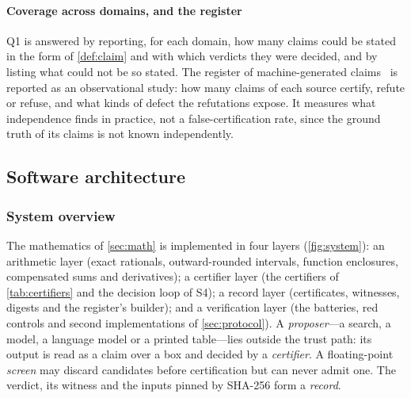 \documentclass[preprint,11pt,a4paper]{elsarticle}
\theoremstyle{definition}
\newcommand{\supp}[1]{S#1}
\begin{document}
\paragraph{Coverage across domains, and the register}
Q1 is answered by reporting, for each domain, how many claims could be stated in the form of \cref{def:claim} and with which verdicts they were decided, and by listing what could not be so stated. The register of machine-generated claims~\citep{Register} is reported as an observational study: how many claims of each source certify, refute or refuse, and what kinds of defect the refutations expose. It measures what independence finds in practice, not a false-certification rate, since the ground truth of its claims is not known independently.

\subsection{Software architecture}\label{sec:architecture}

\subsubsection{System overview}\label{sec:overview}

The mathematics of \cref{sec:math} is implemented in four layers (\cref{fig:system}): an arithmetic layer (exact rationals, outward-rounded intervals, function enclosures, compensated sums and derivatives); a certifier layer (the certifiers of \cref{tab:certifiers} and the decision loop of \supp{4}); a record layer (certificates, witnesses, digests and the register's builder); and a verification layer (the batteries, red controls and second implementations of \cref{sec:protocol}). A \emph{proposer}---a search, a model, a language model or a printed table---lies outside the trust path: its output is read as a claim over a box and decided by a \emph{certifier}. A floating-point \emph{screen} may discard candidates before certification but can never admit one. The verdict, its witness and the inputs pinned by SHA-256 form a \emph{record}.
\end{document}
